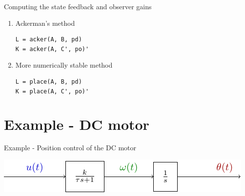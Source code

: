 \documentclass[presentation,aspectratio=169]{beamer}
\begin{document}
\begin{frame}[label={sec:orgc1e9ad6},fragile]{Computing the state feedback and  observer gains}
 \begin{enumerate}
\item \alert{Ackerman's method} 
\begin{verbatim}
L = acker(A, B, pd)
K = acker(A, C', po)'
\end{verbatim}
\item \alert{More numerically stable method} 
\begin{verbatim}
L = place(A, B, pd)
K = place(A, C', po)'
\end{verbatim}
\end{enumerate}
\end{frame}

\section{Example - DC motor}
\label{sec:org5db664c}
\begin{frame}[label={sec:org3e671f9}]{Example - Position control of the DC motor}
\begin{center}
  \includegraphics[width=0.8\linewidth]{../../figures/block-DC}
\end{center}
\end{frame}
\end{document}
